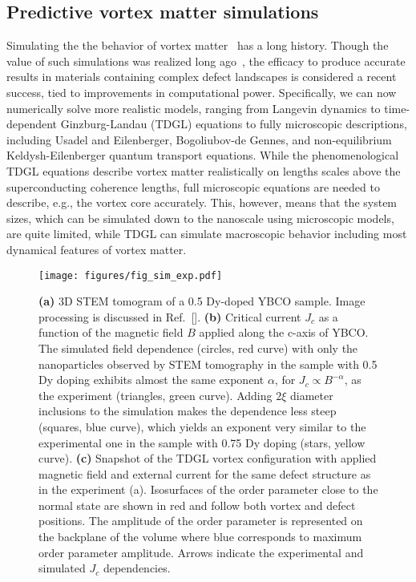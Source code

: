 \documentclass[%
 aip,
 amsmath,amssymb,
 reprint,%
floatfix]{revtex4-1}
\newcommand{\Jc}{J_{c}}
\begin{document}
\subsection{Predictive vortex matter simulations}
Simulating the the behavior of vortex matter~\cite{Blatter1994,Brandt:1995,Crabtree1997,Nattermann2000,BlatterG:2003,ROPP} has a long history.  Though the value of such simulations was realized long ago~\cite{BrandtJLTP83-1,BrandtJLTP83-2}, the efficacy to produce accurate results in materials containing complex defect landscapes is considered a recent success, tied to improvements in computational power.  Specifically, we can now numerically solve more realistic models, ranging from Langevin dynamics to time-dependent Ginzburg-Landau (TDGL) equations to fully microscopic descriptions, including Usadel and Eilenberger, Bogoliubov-de Gennes, and non-equilibrium Keldysh-Eilenberger quantum transport equations. While the phenomenological TDGL equations describe vortex matter realistically on lengths scales above the superconducting coherence lengths, full microscopic equations are needed to describe, e.g., the vortex core accurately. This, however, means that the system sizes, which can be simulated down to the nanoscale using microscopic models, are quite limited, while TDGL can simulate macroscopic behavior including most dynamical features of vortex matter.


%
\begin{figure*}
\texttt{[image: figures/fig\_sim\_exp.pdf]}
\caption{\textbf{(a)} 3D STEM tomogram of a 0.5 Dy-doped YBCO sample. Image processing is discussed in Ref.~[]. \textbf{(b)} Critical current $\Jc$ as a function of the magnetic field $B$ applied along the c-axis of YBCO. The simulated field dependence (circles, red curve) with only the nanoparticles observed by STEM tomography in the sample with 0.5 Dy doping exhibits almost the same exponent $\alpha$, for $J_c \propto B^{-\alpha}$, as the experiment (triangles, green curve). Adding $2\xi$ diameter inclusions to the simulation makes the dependence less steep (squares, blue curve), which yields an exponent very similar to the experimental one in the sample with 0.75 Dy doping (stars, yellow curve).
\textbf{(c)} Snapshot of the TDGL vortex configuration with applied magnetic field and external current for the same defect structure as in the experiment (a). Isosurfaces of the order parameter close to the normal state are shown in red and follow both vortex and defect positions. The amplitude of the order parameter is represented on the backplane of the volume where blue corresponds to maximum order parameter amplitude. Arrows indicate the experimental and simulated $\Jc$ dependencies.}\label{fig:tomogram}
\end{figure*}
%
\end{document}
